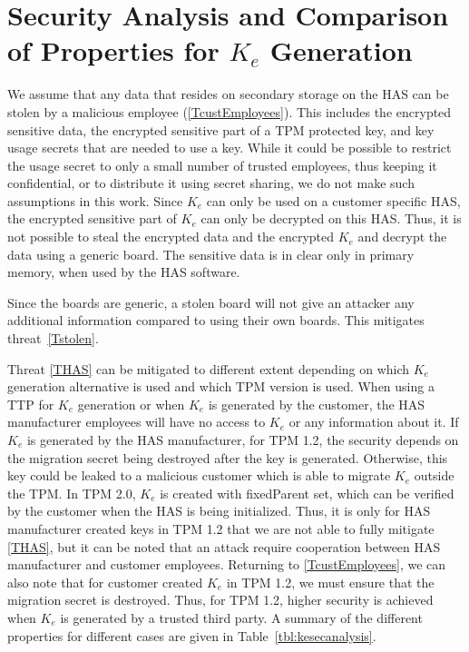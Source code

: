 {\section{\texorpdfstring{Security Analysis and Comparison of Properties for $K_e$ Generation}{Security Analysis and Comparison of Properties for Ke Generation}} \label{sec:secanalysis}
We assume that any data that resides on secondary storage on the HAS can be stolen by a malicious employee (\ref{TcustEmployees}). This includes the encrypted sensitive data, the encrypted sensitive part of a TPM protected key, and key usage secrets that are needed to use a key. While it could be possible to restrict the usage secret to only a small number of trusted employees, thus keeping it confidential, or to distribute it using secret sharing, we do not make such assumptions in this work. Since $K_e$ can only be used on a customer specific HAS, the encrypted sensitive part of $K_e$ can only be decrypted on this HAS. Thus, it is not possible to steal the encrypted data and the encrypted $K_e$ and decrypt the data using a generic board. The sensitive data is in clear only in primary memory, when used by the HAS software.

Since the boards are generic, a stolen board will not give an attacker any additional information compared to using their own boards. This mitigates threat~\ref{Tstolen}.

Threat \ref{THAS} can be mitigated to different extent depending on which $K_e$ generation alternative is used and which TPM version is used. When using a TTP for $K_e$ generation or when $K_e$ is generated by the customer, the HAS manufacturer employees will have no access to $K_e$ or any information about it. If $K_e$ is generated by the HAS manufacturer, for TPM 1.2, the security depends on the migration secret being destroyed after the key is generated. Otherwise, this key could be leaked to a malicious customer which is able to migrate $K_e$ outside the TPM. In TPM 2.0, $K_e$ is created with fixedParent set, which can be verified by the customer when the HAS is being initialized. Thus, it is only for HAS manufacturer created keys in TPM 1.2 that we are not able to fully mitigate \ref{THAS}, but it can be noted that an attack require cooperation between HAS manufacturer and customer employees. Returning to \ref{TcustEmployees}, we can also note that for customer created $K_e$ in TPM 1.2, we must ensure that the migration secret is destroyed. Thus, for TPM 1.2, higher security is achieved when $K_e$ is generated by a trusted third party. A summary of the different properties for different cases are given in Table~\ref{tbl:kesecanalysis}.

}

